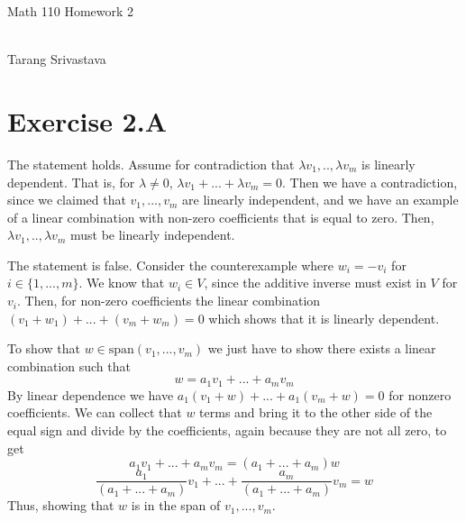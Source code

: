 \documentclass[10pt, twocolumn]{article}
\author{Tarang Srivastava}
\newcommand{\vspan}{\text{span}}
\newcommand{\makechaptertitle}[1]{
\begin{center}
	\begin{large}
		#1
	\end{large}
	\begin{small}
		\\Tarang Srivastava
	\end{small}
\end{center}
}
\begin{document}
	
\makechaptertitle{Math 110 Homework 2}

\section{Exercise 2.A}
\begin{q}[Problem 8]
    The statement holds. 
    Assume for contradiction that $ \lambda v_1, .., \lambda v_m $ is linearly dependent. 
    That is, for $ \lambda \neq 0 $, $ \lambda v_1 +  ... + \lambda v_m = 0 $. 
    Then we have a contradiction, since we claimed that $ v_1, ..., v_m $ are linearly independent,
    and we have an example of a linear combination with non-zero coefficients that is equal to zero. 
    Then, $ \lambda v_1, .., \lambda v_m $ must be linearly independent.
\end{q}
\begin{q}[Problem 9]
    The statement is false. 
    Consider the counterexample where $ w_i = -v_i $ for $ i \in \{1, ..., m\} $. 
    We know that $ w_i \in V $, since the additive inverse must exist in $ V $ for $ v_i $. 
    Then, for non-zero coefficients the linear combination $ (v_1 + w_1) +  ... + (v_m + w_m) = 0 $ 
    which shows that it is linearly dependent.
\end{q}
\begin{q}[Problem 10]
    To show that $ w \in \vspan(v_1, ..., v_m) $ we just have to show there exists a linear combination 
    such that $$ w = a_1v_1 + ...+ a_m v_m $$ 
    By linear dependence we have $ a_1(v_1 + w) + ... + a_1(v_m + w) = 0 $ for nonzero coefficients. 
    We can collect that $ w $ terms and bring it to the other side of the equal sign and divide by the coefficients, again because they are not all zero, to get
    $$ a_1 v_1 + ... + a_m v_m = (a_1 + ... + a_m) w $$ 
    $$ \frac{a_1}{(a_1 + ... + a_m)} v_1 + ... + \frac{a_m}{(a_1 + ... + a_m)} v_m = w $$
    Thus, showing that $ w $ is in the span of $ v_1, ..., v_m $. 
\end{q}
\begin{q}[Problem 11]
      
\end{q}
\end{document}

